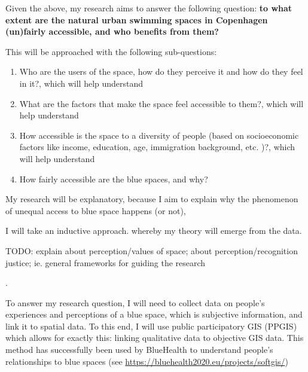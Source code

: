 \documentclass{article}
\begin{document}
Given the above, my research aims to answer the following question: \textbf{to what extent are the natural urban swimming spaces in Copenhagen (un)fairly accessible, and who benefits from them?}

This will be approached with the following sub-questions:

\begin{enumerate}
	\item Who are the users of the space, how do they perceive it and how do they feel in it?, which will help understand
	\item What are the factors that make the space feel accessible to them?, which will help understand
	\item How accessible is the space to a diversity of people (based on socioeconomic factors like income, education, age, immigration background, etc. \parencite{baro2021school})?, which will help understand
	\item How fairly accessible are the blue spaces, and why?
\end{enumerate}


My research will be explanatory, because I aim to explain why the phenomenon of unequal access to blue space happens (or not), 

I will take an inductive approach. whereby my theory will emerge from the data.

TODO: explain about perception/values of space; about perception/recognition justice; ie. general frameworks for guiding the research
 
\parencite{kronenberg2020environmental}. 



To answer my research question, I will need to collect data on people's experiences and perceptions of a blue space, which is subjective information, and link it to spatial data. To this end, I will use public participatory GIS (PPGIS) which allows for exactly this: linking qualitative data to objective GIS data. This method has successfully been used by BlueHealth to understand people's relationships to blue spaces (see \url{https://bluehealth2020.eu/projects/softgis/}) 

\end{document}
